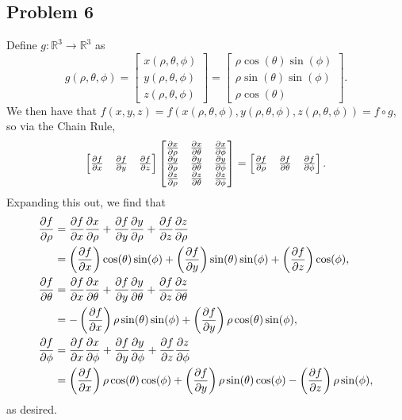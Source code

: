 \documentclass[11pt]{article}
\begin{document}

\subsection{Problem 6}

Define $g : \mathbb{R}^{3} \to \mathbb{R}^{3}$ as 
\[
	g(\rho, \theta, \phi) = \begin{bmatrix} x(\rho, \theta, \phi) \\ y(\rho, \theta, \phi) \\ z(\rho, \theta, \phi) \end{bmatrix} = \begin{bmatrix} \rho \cos(\theta) \sin(\phi) \\ \rho \sin(\theta) \sin(\phi) \\ \rho \cos(\theta) \end{bmatrix}.
\]
We then have that $f(x, y, z) = f(x(\rho, \theta, \phi), y(\rho, \theta, \phi), z(\rho, \theta, \phi)) = f \circ g$, so via the Chain Rule,
\[
	\begin{bmatrix} \pdv{f}{x} & \pdv{f}{y} & \pdv{f}{z} \end{bmatrix} \begin{bmatrix} \pdv{x}{\rho} & \pdv{x}{\theta} & \pdv{x}{\phi} \\ \pdv{y}{\rho} & \pdv{y}{\theta} & \pdv{y}{\phi} \\ \pdv{z}{\rho} & \pdv{z}{\theta} & \pdv{z}{\phi} \end{bmatrix} = \begin{bmatrix} \pdv{f}{\rho} & \pdv{f}{\theta} & \pdv{f}{\phi} \end{bmatrix}.
\]
Expanding this out, we find that
\begin{align*}
	\pdv{f}{\rho} &= \pdv{f}{x} \pdv{x}{\rho} + \pdv{f}{y} \pdv{y}{\rho} + \pdv{f}{z} \pdv{z}{\rho} \\
	&= \left( \pdv{f}{x} \right) \cos(\theta) \sin(\phi) + \left( \pdv{f}{y} \right) \sin(\theta)\sin(\phi) + \left( \pdv{f}{z} \right) \cos(\phi), \\
	\pdv{f}{\theta} &= \pdv{f}{x} \pdv{x}{\theta} + \pdv{f}{y} \pdv{y}{\theta} + \pdv{f}{z} \pdv{z}{\theta} \\
	&= - \left( \pdv{f}{x} \right) \rho \sin(\theta) \sin(\phi) + \left( \pdv{f}{y} \right) \rho \cos(\theta) \sin(\phi), \\
	\pdv{f}{\phi} &= \pdv{f}{x} \pdv{x}{\phi} + \pdv{f}{y} \pdv{y}{\phi} + \pdv{f}{z} \pdv{z}{\phi} \\
	&= \left( \pdv{f}{x} \right) \rho \cos(\theta) \cos(\phi) + \left( \pdv{f}{y} \right) \rho \sin(\theta) \cos(\phi) - \left( \pdv{f}{z} \right) \rho \sin(\phi),
\end{align*}
as desired.
\end{document}

